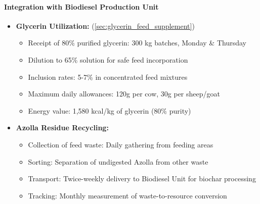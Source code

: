 \paragraph{Integration with Biodiesel Production Unit}
\begin{itemize}
    \item \textbf{Glycerin Utilization:} (\ref{sec:glycerin_feed_supplement})
    \begin{itemize}
        \item Receipt of 80\% purified glycerin: 300 kg batches, Monday \& Thursday
        \item Dilution to 65\% solution for safe feed incorporation
        \item Inclusion rates: 5-7\% in concentrated feed mixtures
        \item Maximum daily allowances: 120g per cow, 30g per sheep/goat
        \item Energy value: 1,580 kcal/kg of glycerin (80\% purity)
    \end{itemize}
    \item \textbf{Azolla Residue Recycling:}
    \begin{itemize}
        \item Collection of feed waste: Daily gathering from feeding areas
        \item Sorting: Separation of undigested Azolla from other waste
        \item Transport: Twice-weekly delivery to Biodiesel Unit for biochar processing
        \item Tracking: Monthly measurement of waste-to-resource conversion
    \end{itemize}
\end{itemize}

